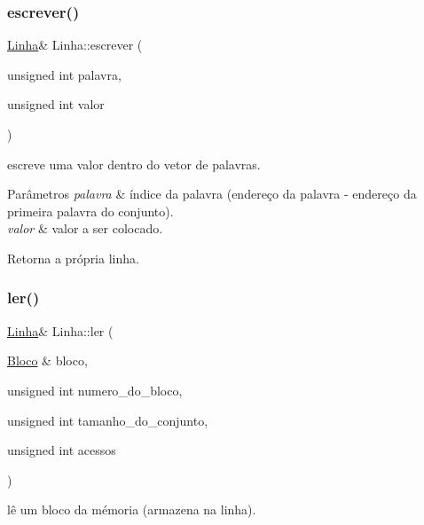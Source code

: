 \subsubsection{\texorpdfstring{escrever()}{escrever()}}
{\footnotesize\ttfamily \hyperlink{structLinha}{Linha}\& Linha\+::escrever (\begin{DoxyParamCaption}\item[{unsigned int}]{palavra,  }\item[{unsigned int}]{valor }\end{DoxyParamCaption})\hspace{0.3cm}{\ttfamily [inline]}}



escreve uma valor dentro do vetor de palavras. 


\begin{DoxyParams}{Parâmetros}
{\em palavra} & índice da palavra (endereço da palavra -\/ endereço da primeira palavra do conjunto). \\
\hline
{\em valor} & valor a ser colocado. \\
\hline
\end{DoxyParams}
\begin{DoxyReturn}{Retorna}
a própria linha. 
\end{DoxyReturn}
\mbox{\label{structLinha_a93ee2fba6780638546c4bbf78445e8bc}} 
\subsubsection{\texorpdfstring{ler()}{ler()}}
{\footnotesize\ttfamily \hyperlink{structLinha}{Linha}\& Linha\+::ler (\begin{DoxyParamCaption}\item[{\hyperlink{structBloco}{Bloco} \&}]{bloco,  }\item[{unsigned int}]{numero\+\_\+do\+\_\+bloco,  }\item[{unsigned int}]{tamanho\+\_\+do\+\_\+conjunto,  }\item[{unsigned int}]{acessos }\end{DoxyParamCaption})\hspace{0.3cm}{\ttfamily [inline]}}



lê um bloco da mémoria (armazena na linha). 


